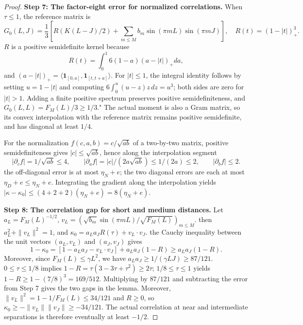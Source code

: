 \documentclass[a4paper,11pt]{article}
\theoremstyle{remark}
\begin{document}
\begin{proof}
\textbf{Step 7: The factor-eight error for normalized correlations.}
When $\tau\leq1$, the reference matrix is
\[
 G_0(L,J)=\frac13\left[R(K(L-J)/2)
 +\sum_{m\le M}b_m\sin(\pi mL)\sin(\pi mJ)\right],
 \quad R(t)=(1-|t|)_+^3.
\]
$R$ is a positive semidefinite kernel because
\[
 R(t)=\int_0^1 6(1-a)(a-|t|)_+da,
\]
and $(a-|t|)_+=\langle\mathbf1_{[0,a]},\mathbf1_{[t,t+a]}\rangle$.
For $|t|\le1$, the integral identity follows by setting $u=1-|t|$ and computing
$6\int_0^u(u-z)z\,dz=u^3$; both sides are zero for $|t|>1$.
Adding a finite positive spectrum preserves positive semidefiniteness, and $G_0(L,L)=F_M(L)/3\geq1/3$."
The actual moment is also a Gram matrix, so its convex interpolation with the reference matrix remains positive semidefinite,
and has diagonal at least $1/4$.

For the normalization $f(c,a,b)=c/\sqrt{ab}$ of a two-by-two matrix, positive semidefiniteness gives
$|c|\leq\sqrt{ab}$, hence along the interpolation segment
\[
 |\partial_cf|=1/\sqrt{ab}\le4,\qquad
 |\partial_af|=|c|/(2a\sqrt{ab})\le1/(2a)\le2,
 \qquad|\partial_bf|\le2.
\]
the off-diagonal error is at most $\eta_N+e$; the two diagonal errors are each at most
$\eta_D+e\leq\eta_N+e$. Integrating the gradient along the interpolation yields
$|\kappa-\kappa_0|\le(4+2+2)(\eta_N+e)=8(\eta_N+e)$.

\textbf{Step 8: The correlation gap for short and medium distances.}
Let $a_L=F_M(L)^{-1/2}$,
$v_L=(\sqrt{b_m}\sin(\pi mL)/\sqrt{F_M(L)})_{m\le M}$.
then $a_L^2+\|v_L\|^2=1$, and
$\kappa_0=a_La_JR(\tau)+v_L\cdot v_J$.
the Cauchy inequality between the unit vectors $(a_L,v_L)$ and $(a_J,v_J)$ gives
\[
 1-\kappa_0=[1-a_La_J-v_L\cdot v_J]+a_La_J(1-R)
 \ge a_La_J(1-R).
\]
Moreover, since $F_M(L)\leq\gamma L^2$, we have
$a_La_J\ge1/(\gamma LJ)\ge87/121$.
$0\leq\tau\leq1/8$ implies
$1-R=\tau(3-3\tau+\tau^2)\ge2\tau$;
$1/8\leq\tau\leq1$ yields $1-R\geq1-(7/8)^3=169/512$.
Multiplying by $87/121$ and subtracting the error from Step 7 gives the two gaps in the lemma.
Moreover, $\|v_L\|^2=1-1/F_M(L)\le34/121$ and $R\ge0$, so
$\kappa_0\ge-\|v_L\|\|v_J\|\ge-34/121$. The actual correlation at near and intermediate separations
is therefore eventually at least $-1/2$.


\end{proof}
\end{document}
